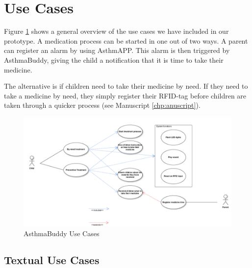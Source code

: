 \section{Use Cases}
Figure \ref{fig:pi-use-cases} shows a general overview of the use cases we have included in our prototype. A medication process can be started in one out of two ways. 
A parent can register an alarm by using AsthmAPP. This alarm is then triggered by AsthmaBuddy, giving the child a notification that it is time to take their medicine.

The alternative is if children need to take their medicine by need. If they need to take a medicine by need, they simply register their RFID-tag before children are taken through a quicker process (see Manuscript \ref{chp:anuscript}).  

\begin{figure}[H] 
	\centering
		\includegraphics[width=0.8\paperwidth]{Pictures/usecases.png}
	\caption{AsthmaBuddy Use Cases}
	\label{fig:pi-use-cases}
\end{figure}

\subsection{Textual Use Cases}

